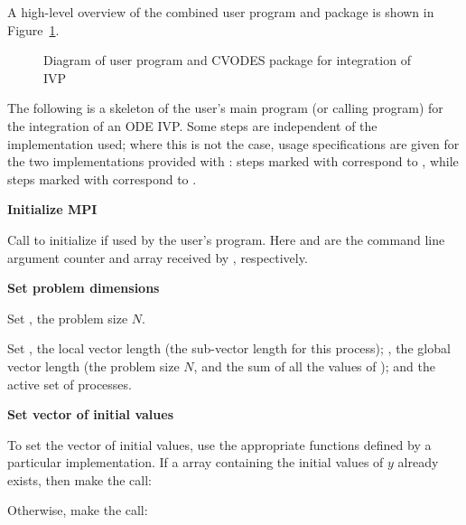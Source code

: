 A high-level overview of the combined user program and {\cvodes} package is
shown in Figure~\ref{f:sim_overview}.
\begin{figure}
\centerline{}
\caption {Diagram of user program and 
  CVODES package for integration of IVP}\label{f:sim_overview}
\end{figure}
The following is a skeleton of the user's main program (or calling
program) for the integration of an ODE IVP. Some steps are independent of the {\nvector}
implementation used; where this is not the case, usage specifications are given for the
two implementations provided with {\cvodes}: steps marked with {\p} correspond to 
{\nvecp}, while steps marked with {\s} correspond to {\nvecs}.
\begin{Steps}
  
\item 
  {\bf {\p} Initialize MPI}

  Call  to initialize {\mpi} if used by
  the user's program. Here  and  are the command line
  argument counter and array received by , respectively.
  
\item
  {\bf Set problem dimensions}

  {\s} Set , the problem size $N$.

  {\p} Set , the local vector length (the sub-vector
  length for this process); , the global vector length (the
  problem size $N$, and the sum of all the values of );
  and the active set of processes.
  
\item
  {\bf Set vector of initial values}
 
  To set the vector  of initial values, use the appropriate functions defined by a
  particular {\nvector} implementation.  If a  array 
  containing the initial values of $y$ already exists, then make the call:

  {\s} 

  {\p} 

  Otherwise, make the call:

  {\s} 

  {\p} 


\end{Steps}
